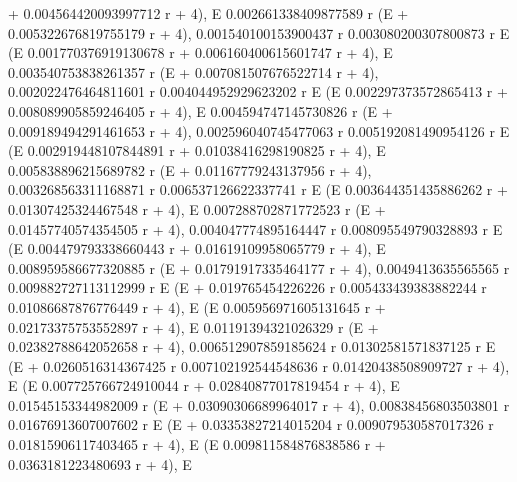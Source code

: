 \documentclass{article}
\begin{document}
     + 0.004564420093997712 r + 4), E
       0.002661338409877589 r
     (E                       + 0.005322676819755179 r + 4), 
     0.001540100153900437 r   0.003080200307800873 r
    E                       (E
                                     0.001770376919130678 r
     + 0.006160400615601747 r + 4), E
       0.003540753838261357 r
     (E                       + 0.007081507676522714 r + 4), 
     0.002022476464811601 r   0.004044952929623202 r
    E                       (E
                                     0.002297373572865413 r
     + 0.008089905859246405 r + 4), E
       0.004594747145730826 r
     (E                       + 0.009189494291461653 r + 4), 
     0.002596040745477063 r   0.005192081490954126 r
    E                       (E
                                    0.002919448107844891 r
     + 0.01038416298190825 r + 4), E
       0.005838896215689782 r
     (E                       + 0.01167779243137956 r + 4), 
     0.003268563311168871 r   0.006537126622337741 r
    E                       (E
                                    0.003644351435886262 r
     + 0.01307425324467548 r + 4), E
       0.007288702871772523 r
     (E                       + 0.01457740574354505 r + 4), 
     0.004047774895164447 r   0.008095549790328893 r
    E                       (E
                                    0.004479793338660443 r
     + 0.01619109958065779 r + 4), E
       0.008959586677320885 r
     (E                       + 0.01791917335464177 r + 4), 
     0.0049413635565565 r   0.009882727113112999 r
    E                     (E                       + 0.019765454226226 r
            0.005433439383882244 r   0.01086687876776449 r
     + 4), E                       (E
                                    0.005956971605131645 r
     + 0.02173375753552897 r + 4), E
       0.01191394321026329 r
     (E                      + 0.02382788642052658 r + 4), 
     0.006512907859185624 r   0.01302581571837125 r
    E                       (E                      + 0.0260516314367425 r
            0.007102192544548636 r   0.01420438508909727 r
     + 4), E                       (E
                                    0.007725766724910044 r
     + 0.02840877017819454 r + 4), E
       0.01545153344982009 r
     (E                      + 0.03090306689964017 r + 4), 
     0.00838456803503801 r   0.01676913607007602 r
    E                      (E                      + 0.03353827214015204 r
            0.009079530587017326 r   0.01815906117403465 r
     + 4), E                       (E
                                   0.009811584876838586 r
     + 0.0363181223480693 r + 4), E
\end{document}
